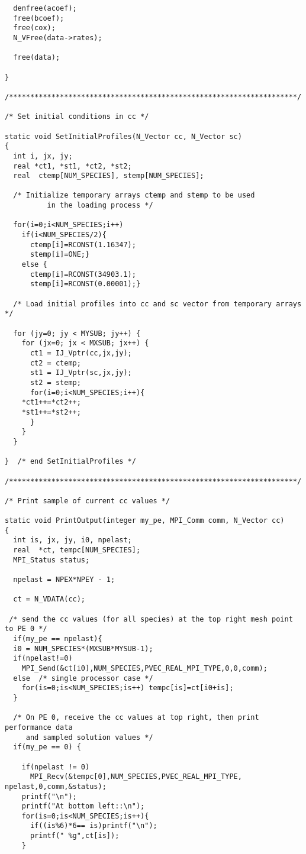 \documentclass[11pt]{article}
\begin{document}
\begin{verbatim}
  denfree(acoef);
  free(bcoef);
  free(cox);
  N_VFree(data->rates);

  free(data);

}

/********************************************************************/

/* Set initial conditions in cc */

static void SetInitialProfiles(N_Vector cc, N_Vector sc)
{
  int i, jx, jy;
  real *ct1, *st1, *ct2, *st2;
  real  ctemp[NUM_SPECIES], stemp[NUM_SPECIES];

  /* Initialize temporary arrays ctemp and stemp to be used
          in the loading process */

  for(i=0;i<NUM_SPECIES;i++)
    if(i<NUM_SPECIES/2){
      ctemp[i]=RCONST(1.16347);
      stemp[i]=ONE;}
    else {
      ctemp[i]=RCONST(34903.1);
      stemp[i]=RCONST(0.00001);}

  /* Load initial profiles into cc and sc vector from temporary arrays */

  for (jy=0; jy < MYSUB; jy++) {
    for (jx=0; jx < MXSUB; jx++) {
      ct1 = IJ_Vptr(cc,jx,jy);
      ct2 = ctemp;
      st1 = IJ_Vptr(sc,jx,jy);
      st2 = stemp;
      for(i=0;i<NUM_SPECIES;i++){
    *ct1++=*ct2++;
    *st1++=*st2++;
      }
    }
  }

}  /* end SetInitialProfiles */

/********************************************************************/

/* Print sample of current cc values */

static void PrintOutput(integer my_pe, MPI_Comm comm, N_Vector cc)
{
  int is, jx, jy, i0, npelast;
  real  *ct, tempc[NUM_SPECIES];
  MPI_Status status;

  npelast = NPEX*NPEY - 1;

  ct = N_VDATA(cc);

 /* send the cc values (for all species) at the top right mesh point to PE 0 */
  if(my_pe == npelast){
  i0 = NUM_SPECIES*(MXSUB*MYSUB-1);
  if(npelast!=0)
    MPI_Send(&ct[i0],NUM_SPECIES,PVEC_REAL_MPI_TYPE,0,0,comm);
  else  /* single processor case */
    for(is=0;is<NUM_SPECIES;is++) tempc[is]=ct[i0+is];   
  }

  /* On PE 0, receive the cc values at top right, then print performance data 
     and sampled solution values */
  if(my_pe == 0) {

    if(npelast != 0)
      MPI_Recv(&tempc[0],NUM_SPECIES,PVEC_REAL_MPI_TYPE, npelast,0,comm,&status);
    printf("\n");
    printf("At bottom left::\n");
    for(is=0;is<NUM_SPECIES;is++){
      if((is%6)*6== is)printf("\n");
      printf(" %g",ct[is]);
    }


\end{verbatim}
\end{document}
